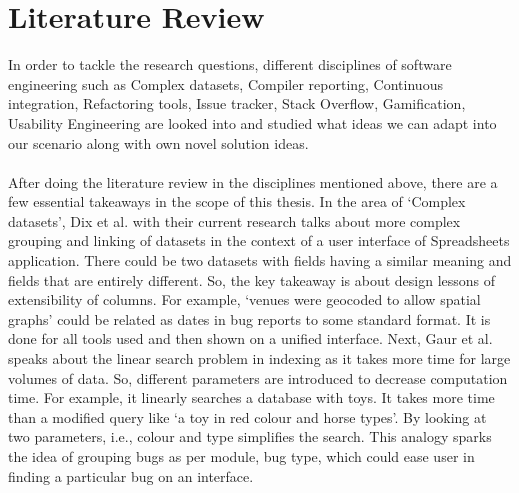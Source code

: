 \chapter{Literature Review}
\label{ch:literaturereview_report}

In order to tackle the research questions, different disciplines of software engineering such as Complex datasets, Compiler reporting, Continuous integration, Refactoring tools, Issue tracker, Stack Overflow, Gamification, Usability Engineering are looked into and studied what ideas we can adapt into our scenario along with own novel solution ideas. \\ \\

After doing the literature review in the disciplines mentioned above, there are a few essential takeaways in the scope of this thesis. In the area of ‘Complex datasets’, Dix et al. \cite{Dix} with their current research talks about more complex grouping and linking of datasets in the context of a user interface of Spreadsheets application. There could be two datasets with fields having a similar meaning and fields that are entirely different. So, the key takeaway is about design lessons of extensibility of columns. For example, ‘venues were geocoded to allow spatial graphs’ could be related as dates in bug reports to some standard format. It is done for all tools used and then shown on a unified interface. Next, Gaur et al. \cite{Gaur} speaks about the linear search problem in indexing as it takes more time for large volumes of data. So, different parameters are introduced to decrease computation time. For example, it linearly searches a database with toys.  It takes more time than a modified query like ‘a toy in red colour and horse types’.  By looking at two parameters, i.e., colour and type simplifies the search. This analogy sparks the idea of grouping bugs as per module, bug type, which could ease user in finding a particular bug on an interface. \\ \\

